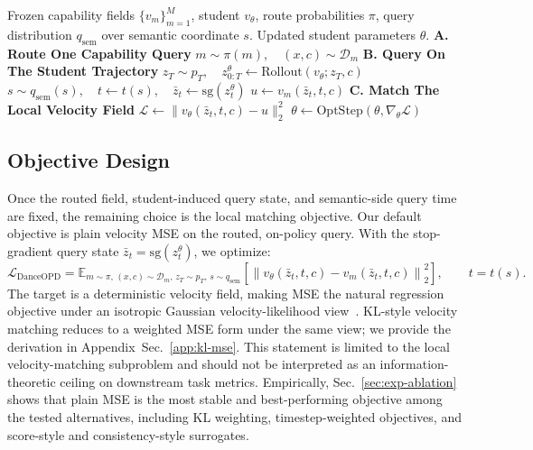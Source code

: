 \documentclass{llmxive}
\providecommand{\name}{\textsl{\textbf{DanceOPD}}\xspace}
\begin{document}
\begin{algorithm}[t]
\caption{\textbf{One \name{} Training Step.} A sample is routed to one capability field, queried on a semantic-side student state, and updated by velocity matching.}
\label{alg:danceopd}
\small
\begin{algorithmic}[1]
\Require Frozen capability fields $\{v_m\}_{m=1}^M$, student $v_\theta$, route probabilities $\pi$, query distribution $q_{\mathrm{sem}}$ over semantic coordinate $s$.
\Ensure Updated student parameters $\theta$.
\Statex \textbf{A. Route One Capability Query}
\State $m \sim \pi(m),\quad (x,c)\sim\mathcal{D}_m$ 
\Statex \textbf{B. Query On The Student Trajectory}
\State $z_T\sim p_T,\quad z_{0:T}^{\theta}\gets \mathrm{Rollout}(v_\theta;z_T,c)$
\State $s\sim q_{\mathrm{sem}}(s),\quad t\gets t(s),\quad \bar z_t\gets \mathrm{sg}(z_t^\theta)$ 
\State $u \gets v_m(\bar z_t,t,c)$ 
\Statex \textbf{C. Match The Local Velocity Field}
\State $\mathcal{L}\gets \bigl\|v_\theta(\bar z_t,t,c)-u\bigr\|_2^2$
\State $\theta\gets \mathrm{OptStep}\!\left(\theta,\nabla_\theta\mathcal{L}\right)$
\end{algorithmic}
\end{algorithm}


\subsection{Objective Design}
\label{sec:objective-design}

Once the routed field, student-induced query state, and semantic-side query time are fixed, the remaining choice is the local matching objective. Our default objective is plain velocity MSE on the routed, on-policy query. With the stop-gradient query state $\bar z_t=\mathrm{sg}(z_t^\theta)$, we optimize:
\begin{equation}
  \mathcal{L}_{\mathrm{DanceOPD}}
  =
  \mathbb{E}_{m\sim\pi,\,(x,c)\sim\mathcal{D}_m,\,z_T\sim p_T,\,s\sim q_{\mathrm{sem}}}
  \left[
    \left\|v_\theta(\bar z_t,t,c)-v_m(\bar z_t,t,c)\right\|_2^2
  \right], \qquad t=t(s).
  \label{eq:danceopd-mse}
\end{equation}
The target is a deterministic velocity field, making MSE the natural regression objective under an isotropic Gaussian velocity-likelihood view~\cite{lipman2022flow,ho2020denoising}. KL-style velocity matching reduces to a weighted MSE form under the same view; we provide the derivation in Appendix~Sec.~\ref{app:kl-mse}. This statement is limited to the local velocity-matching subproblem and should not be interpreted as an information-theoretic ceiling on downstream task metrics. Empirically, Sec.~\ref{sec:exp-ablation} shows that plain MSE is the most stable and best-performing objective among the tested alternatives, including KL weighting, timestep-weighted objectives, and score-style and consistency-style surrogates.
\end{document}
